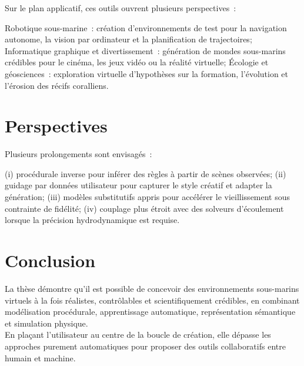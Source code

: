 Sur le plan applicatif, ces outils ouvrent plusieurs perspectives~:
\begin{Itemize}
    \Item{} Robotique sous-marine~: création d'environnements de test pour la navigation autonome, la vision par ordinateur et la planification de trajectoires;
    \Item{} Informatique graphique et divertissement~: génération de mondes sous-marins crédibles pour le cinéma, les jeux vidéo ou la réalité virtuelle;
    \Item{} Écologie et géosciences~: exploration virtuelle d'hypothèses sur la formation, l'évolution et l'érosion des récifs coralliens.
\end{Itemize}

\section*{Perspectives}
Plusieurs prolongements sont envisagés~: 
\begin{Itemize}
    \Item{} (i) procédurale inverse pour inférer des règles à partir de scènes observées;
    \Item{} (ii) guidage par données utilisateur pour capturer le style créatif et adapter la génération;
    \Item{} (iii) modèles substitutifs appris pour accélérer le vieillissement sous contrainte de fidélité;
    \Item{} (iv) couplage plus étroit avec des solveurs d'écoulement lorsque la précision hydrodynamique est requise.
\end{Itemize}


\section*{Conclusion}
La thèse démontre qu'il est possible de concevoir des environnements sous-marins virtuels à la fois réalistes, contrôlables et scientifiquement crédibles, en combinant modélisation procédurale, apprentissage automatique, représentation sémantique et simulation physique. \\
En plaçant l'utilisateur au centre de la boucle de création, elle dépasse les approches purement automatiques pour proposer des outils collaboratifs entre humain et machine. \\

































